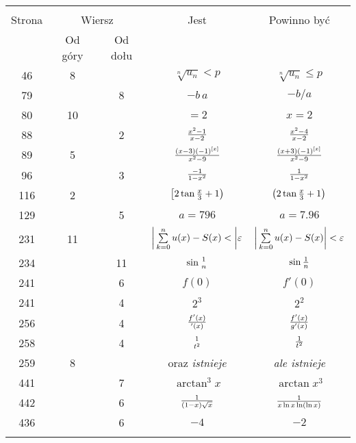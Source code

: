 \documentclass[a4paper,11pt]{article}
\begin{document}
\begin{center}
  \begin{tabular}{|c|c|c|c|c|}
    \hline
    & \multicolumn{2}{c|}{} & & \\
    Strona & \multicolumn{2}{c|}{Wiersz}& Jest & Powinno być \\ \cline{2-3}
    & Od góry & Od dołu &  &  \\ \hline
    46 & 8 & & $\sqrt[n]{ u_{ n } } < p$ & $\sqrt[n]{ u_{ n } } \leq p$ \\
    79 & & 8 & $-b \, a$ & $-b / a$ \\
    80 & 10 & & $= 2$ & $x = 2$ \\
    88 & & 2 & $\frac{ x^{ 2 } - 1 }{ x - 2 }$ & $\frac{ x^{ 2 } - 4 }
                                               { x - 2 }$ \\
    89 & 5 & & $\frac{ ( x - 3 )( -1 )^{ [ x ] } }{ x^{ 2 } - 9 }$
           & $\frac{ ( x + 3 )( -1 )^{ [ x ] } }{ x^{ 2 } - 9 }$ \\
    96 & & 3 & $\frac{ -1 }{ 1 - x^{ 2 } }$
           & $\frac{ 1 }{ 1 - x^{ 2 } }$ \\
    116 & 2 & & $\left[ 2 \tan \frac{ x }{ 3 } + 1 \right)$
           & $ \left( 2 \tan \frac{ x }{ 3 } + 1 \right)$ \\
    129 & & 5 & $a = 796$ & $a = 7.96$ \\
    231 & 11 & & $\bigg| \sum\limits_{ k = 0 }^{ n } u( x ) - S( x ) < \bigg|
                 \varepsilon$
           & $\bigg| \sum\limits_{ k = 0 }^{ n } u( x )
             - S( x ) \bigg| < \varepsilon$ \\
    234 & & 11 & $\sin{ 1 \atop n }$ & $\sin \frac{ 1 }{ n }$ \\
    241 & & 6 & $f( 0 )$ & $f'( 0 )$ \\
    241 & & 4 & $2^{ 3 }$ & $2^{ 2 }$ \\
    256 & & 4 & $\frac{ f'( x ) }{ {}'( x ) }$ & $\frac{ f'( x ) }
                                               { g'( x ) }$ \\
    258 & & 4 & ${ 1 \atop t^{ 2 } }$ & $\frac{ 1 }{ t^{ 2 } }$ \\
    259 & 8 & & oraz \emph{istnieje} & \emph{ale istnieje} \\
    441 & & 7 & $\arctan^{ 3 }x$ & $\arctan x^{ 3 }$ \\
    442 & & 6 & $\frac{ 1 }{ ( 1 - x ) \sqrt{ x } }$
           & $\frac{ 1 }{ x \ln x \ln( \ln x ) }$ \\
    436 & & 6  & $-4$ & $-2$ \\
    & & & & \\ \hline
  \end{tabular}
\end{center}
\end{document}
